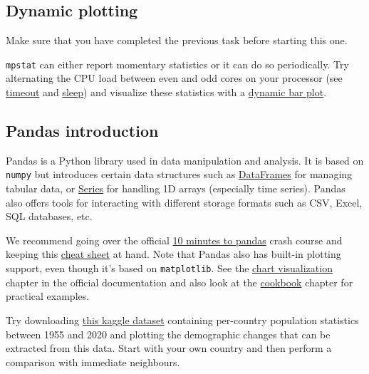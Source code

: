 \subsection{Dynamic plotting}

Make sure that you have completed the previous task before starting this one.

\texttt{mpstat} can either report momentary statistics or it can do so
periodically. Try alternating the CPU load between even and odd cores on your
processor (see \href{https://man.archlinux.org/man/timeout.1}{timeout} and
\href{https://man.archlinux.org/man/sleep.1}{sleep}) and visualize these
statistics with a
\href{https://holypython.com/python-visualization-tutorial/creating-bar-chart-animations/}
{dynamic bar plot}.

\subsection{Pandas introduction}

Pandas is a Python library used in data manipulation and analysis. It is based
on \texttt{numpy} but introduces certain data structures such as
\href{https://pandas.pydata.org/pandas-docs/stable/reference/api/pandas.DataFrame.html}
{DataFrames} for managing tabular data, or
\href{https://pandas.pydata.org/pandas-docs/stable/reference/api/pandas.Series.html}
{Series} for handling 1D arrays (especially time series). Pandas also offers
tools for interacting with different storage formats such as CSV, Excel, SQL
databases, etc.

We recommend going over the official
\href{https://pandas.pydata.org/pandas-docs/stable/user_guide/10min.html}{10
minutes to pandas} crash course and keeping this
\href{https://github.com/pandas-dev/pandas/blob/main/doc/cheatsheet/Pandas_Cheat_Sheet.pdf}
{cheat sheet} at hand. Note that Pandas also has built-in plotting support,
even though it's based on \texttt{matplotlib}. See the
\href{https://pandas.pydata.org/pandas-docs/stable/user_guide/visualization.html}
{chart visualization} chapter in the official documentation and also look at
the \href{https://pandas.pydata.org/pandas-docs/stable/user_guide/cookbook.html#cookbook-plotting}
{cookbook} chapter for practical examples.

Try downloading \href{https://www.kaggle.com/datasets/themlphdstudent/countries-population-from-1955-to-2020}
{this kaggle dataset} containing per-country population statistics between
1955 and 2020 and plotting the demographic changes that can be extracted from
this data. Start with your own country and then perform a comparison with
immediate neighbours.


